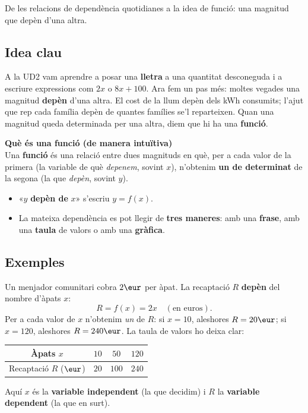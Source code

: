 %
{De les relacions de dependència quotidianes a la idea de funció: una magnitud que depèn d'una altra.}

\subsection{Idea clau}

A la UD2 vam aprendre a posar una \textbf{lletra} a una quantitat desconeguda i a
escriure expressions com $2x$ o $8x+100$. Ara fem un pas més: moltes vegades una
magnitud \textbf{depèn} d'una altra. El cost de la llum depèn dels kWh consumits;
l'ajut que rep cada família depèn de quantes famílies se'l reparteixen. Quan una
magnitud queda determinada per una altra, diem que hi ha una \textbf{funció}.

\begin{idea}
\textbf{Què és una funció (de manera intuïtiva)}\\
Una \textbf{funció} és una relació entre dues magnituds en què, per a cada valor de
la primera (la variable de què \emph{depenem}, sovint $x$), n'obtenim
\textbf{un de determinat} de la segona (la que \emph{depèn}, sovint $y$).
\begin{itemize}[leftmargin=1.4em, itemsep=2pt]
  \item «$y$ \textbf{depèn de} $x$» \quad s'escriu \quad $y=f(x)$.
  \item La mateixa dependència es pot llegir de \textbf{tres maneres}: amb una
        \textbf{frase}, amb una \textbf{taula} de valors o amb una \textbf{gràfica}.
\end{itemize}
\end{idea}

\subsection{Exemples}

\begin{exemple}
Un menjador comunitari cobra $2\eur$ per àpat. La recaptació $R$ \textbf{depèn} del
nombre d'àpats $x$:
\[
R = f(x) = 2x \quad(\text{en euros}).
\]
Per a cada valor de $x$ n'obtenim \emph{un} de $R$: si $x=10$, aleshores $R=20\eur$;
si $x=120$, aleshores $R=240\eur$. La taula de valors ho deixa clar:

\begin{center}
\begin{tabular}{c c c c}
\toprule
Àpats $x$ & $10$ & $50$ & $120$ \\
\midrule
Recaptació $R$ ($\eur$) & $20$ & $100$ & $240$ \\
\bottomrule
\end{tabular}
\end{center}
Aquí $x$ és la \textbf{variable independent} (la que decidim) i $R$ la
\textbf{variable dependent} (la que en surt).
\end{exemple}

